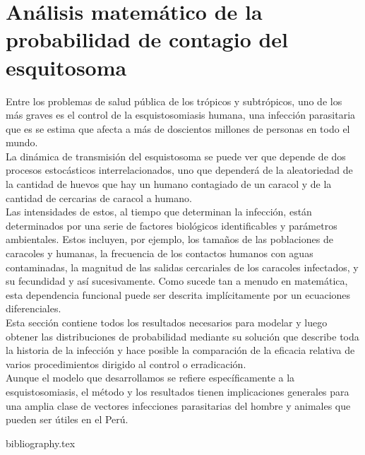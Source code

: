 \documentclass[a4paper,11pt]{book}
\begin{document}
\chapter{Análisis matemático de la probabilidad de contagio del esquitosoma}
Entre los problemas de salud pública de los trópicos y subtrópicos, uno de los más graves es el control de la esquistosomiasis humana, una infección parasitaria que es
se estima que afecta a más de doscientos millones de personas en todo el
mundo.\\
La dinámica de transmisión del esquistosoma se puede ver que depende de dos procesos estocásticos interrelacionados, uno que dependerá de la aleatoriedad de la cantidad de huevos que hay un humano contagiado de un caracol y de la cantidad de cercarias de caracol a humano.\\
Las intensidades de estos, al tiempo que determinan la infección, están determinados por una serie de factores biológicos identificables y parámetros ambientales. Estos incluyen, por ejemplo, los tamaños de las poblaciones de caracoles y humanas, la frecuencia de los contactos humanos con aguas contaminadas, la magnitud de las salidas cercariales de los caracoles infectados, y su fecundidad y así sucesivamente. Como sucede tan a menudo en matemática, esta dependencia funcional puede ser descrita implícitamente por un ecuaciones diferenciales.\\
Esta sección contiene todos los resultados necesarios para modelar y luego obtener las distribuciones de probabilidad mediante su solución que describe toda la historia de la infección y hace posible la comparación de la eficacia relativa de varios procedimientos dirigido al control o erradicación.\\
Aunque el modelo que desarrollamos se refiere específicamente a la esquistosomiasis, el método y los resultados tienen implicaciones generales para una amplia clase de vectores infecciones parasitarias del hombre y animales que pueden ser útiles en el Perú.\\
    
    
    
    
    

\backmatter

{bibliography.tex}
\end{document}
